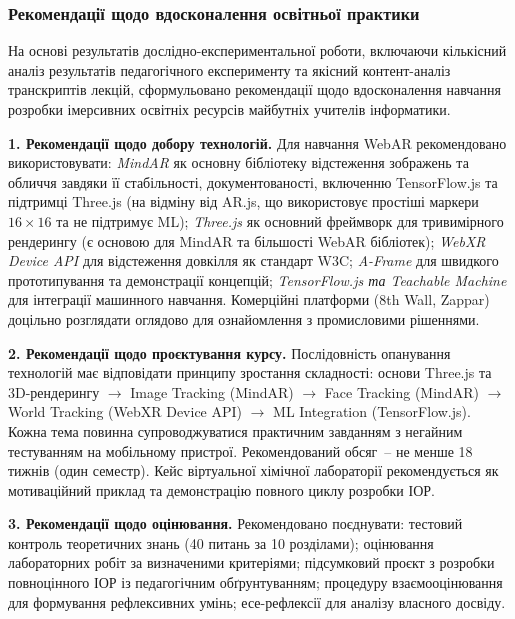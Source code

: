 
\subsubsection{Рекомендації щодо вдосконалення освітньої практики}

На основі результатів дослідно-експериментальної роботи, включаючи кількісний аналіз результатів педагогічного експерименту та якісний контент-аналіз транскриптів лекцій, сформульовано рекомендації щодо вдосконалення навчання розробки імерсивних освітніх ресурсів майбутніх учителів інформатики.

\textbf{1. Рекомендації щодо добору технологій.} Для навчання WebAR рекомендовано використовувати: \textit{MindAR} як основну бібліотеку відстеження зображень та обличчя завдяки її стабільності, документованості, включенню TensorFlow.js та підтримці Three.js (на відміну від AR.js, що використовує простіші маркери $16 \times 16$ та не підтримує ML); \textit{Three.js} як основний фреймворк для тривимірного рендерингу (є основою для MindAR та більшості WebAR бібліотек); \textit{WebXR Device API} для відстеження довкілля як стандарт W3C; \textit{A-Frame} для швидкого прототипування та демонстрації концепцій; \textit{TensorFlow.js та Teachable Machine} для інтеграції машинного навчання. Комерційні платформи (8th Wall, Zappar) доцільно розглядати оглядово для ознайомлення з промисловими рішеннями.

\textbf{2. Рекомендації щодо проєктування курсу.} Послідовність опанування технологій має відповідати принципу зростання складності: основи Three.js та 3D-рендерингу $\to$ Image Tracking (MindAR) $\to$ Face Tracking (MindAR) $\to$ World Tracking (WebXR Device API) $\to$ ML Integration (TensorFlow.js). Кожна тема повинна супроводжуватися практичним завданням з негайним тестуванням на мобільному пристрої. Рекомендований обсяг~-- не менше 18 тижнів (один семестр). Кейс віртуальної хімічної лабораторії рекомендується як мотиваційний приклад та демонстрацію повного циклу розробки ІОР.

\textbf{3. Рекомендації щодо оцінювання.} Рекомендовано поєднувати: тестовий контроль теоретичних знань (40 питань за 10 розділами); оцінювання лабораторних робіт за визначеними критеріями; підсумковий проєкт з розробки повноцінного ІОР із педагогічним обґрунтуванням; процедуру взаємооцінювання для формування рефлексивних умінь; есе-рефлексії для аналізу власного досвіду.

